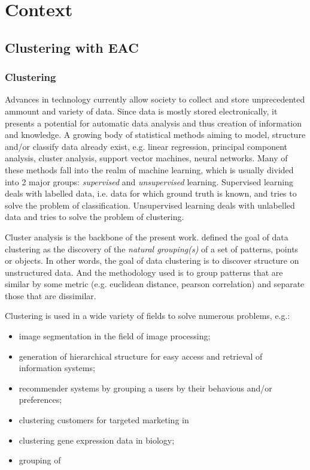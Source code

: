 \section{Context}
\label{sec:context}

\subsection{Clustering with EAC}

\subsubsection{Clustering}
\label{sec:clustering}

Advances in technology currently allow society to collect and store unprecedented ammount and variety of data. Since data is mostly stored electronically, it presents a potential for automatic data analysis and thus creation of information and knowledge. A growing body of statistical methods aiming to model, structure and/or classify data already exist, e.g. linear regression, principal component analysis, cluster analysis, support vector machines, neural networks. Many of these methods fall into the realm of machine learning, which is usually divided into 2 major groups: \textit{supervised} and \textit{unsupervised} learning. %
Supervised learning deals with labelled data, i.e. data for which ground truth is known, and tries to solve the problem of classification. Unsupervised learning deals with unlabelled data and tries to solve the problem of clustering.

Cluster analysis is the backbone of the present work. %
defined the goal of data clustering as the discovery of the \textit{natural grouping(s)} of a set of patterns, points or objects. In other words, the goal of data clustering is to discover structure on unstructured data. And the methodology used is to group patterns that are similar by some metric (e.g. euclidean distance, pearson correlation) and separate those that are dissimilar. %

Clustering is used in a wide variety of fields to solve numerous problems, e.g.:
\begin{itemize}
\item image segmentation in the field of image processing;
\item generation of hierarchical structure for easy access and retrieval of information systems;
\item recommender systems by grouping a users by their behavious and/or preferences;
\item clustering customers for targeted marketing in 
\item clustering gene expression data in biology;
\item grouping of 
\end{itemize}



